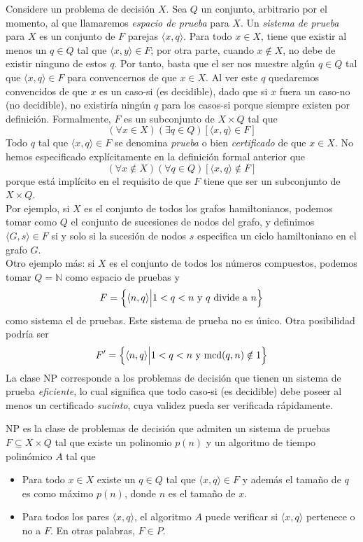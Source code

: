 Considere un problema de decisión $X$. Sea $Q$ un conjunto, arbitrario por el momento, al que llamaremos \emph{espacio de prueba} para $X$. Un \emph{sistema de prueba} para $X$ es un conjunto de $F$ parejas $\langle x, q \rangle$. Para todo $x \in X$, tiene que existir al menos un $q \in Q$ tal que $\langle x, y \rangle \in F$; por otra parte, cuando $x \notin X$, no debe de existir ninguno de estos $q$. Por tanto, basta que el ser nos muestre algún $q \in Q$ tal que $\langle x, q \rangle \in F$ para convencernos de que $x \in X$. Al ver este $q$ quedaremos convencidos de que $x$ es un caso-si (es decidible), dado que si $x$ fuera un caso-no (no decidible), no existiría ningún $q$ para los casos-si porque siempre existen por definición. Formalmente, $F$ es un subconjunto de $X \times Q$ tal que
\[ (\forall x \in X)(\exists q \in Q)[\langle x, q \rangle \in F] \]
Todo $q$ tal que $\langle x, q \rangle \in F$ se denomina \emph{prueba} o bien \emph{certificado} de que $x \in X$. No hemos especificado explícitamente en la definición formal anterior que
\[ (\forall x \notin X)(\forall q \in Q)[\langle x, q \rangle \notin F] \]
porque está implícito en el requisito de que $F$ tiene que ser un subconjunto de $X \times Q$.\\
Por ejemplo, si $X$ es el conjunto de todos los grafos hamiltonianos, podemos tomar como $Q$ el conjunto de sucesiones de nodos del grafo, y definimos $\langle G, s \rangle \in F$ si y solo si la sucesión de nodos $s$ especifica un ciclo hamiltoniano en el grafo $G$.\\
Otro ejemplo más: si $X$ es el conjunto de todos los números compuestos, podemos tomar $Q = \mathbb{N}$ como espacio de pruebas y
\[ F = \Bigl\{\langle n, q \rangle \Bigl| 1 < q < n\ \mbox{y}\ q\ \mbox{divide a}\ n \Bigl\} \]
como sistema el de pruebas. Este sistema de prueba no es único. Otra posibilidad podría ser
\[ F' = \Bigl\{\langle n, q \rangle \Bigl| 1 < q < n\ \mbox{y mcd}(q,n) \notin 1 \Bigl\} \]
La clase NP corresponde a los problemas de decisión que tienen un sistema de prueba \emph{eficiente}, lo cual significa que todo caso-si (es decidible) debe poseer al menos un certificado \emph{sucinto}, cuya validez pueda ser verificada rápidamente.\\

\begin{fondo}
\label{eq:def} 
NP es la clase de problemas de decisión que admiten un sistema de pruebas $F \subseteq X \times Q$ tal que existe un polinomio $p(n)$ y un algoritmo de tiempo polinómico $A$ tal que
\begin{itemize}
\item Para todo $x \in X$ existe un $q \in Q$ tal que $\langle x, q \rangle \in F$ y además el tamaño de $q$ es como máximo $p(n)$, donde $n$ es el tamaño de $x$.
\item Para todos los pares $\langle x, q \rangle$, el algoritmo $A$ puede verificar si $\langle x, q \rangle$ pertenece o no a $F$. En otras palabras, $F \in P$.
\end{itemize}
\end{fondo}

